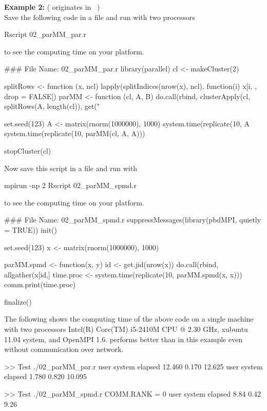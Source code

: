 {\bf Example 2:} ( originates in ~\citep{Tierney2012}) \\
Save the following code in a file and run with two processors
\begin{Command}
Rscript 02_parMM_par.r
\end{Command}
to see the computing time on your platform.
\begin{Code}[title=\pkg{snow} R Script]
### File Name: 02_parMM_par.r
library(parallel)
cl <- makeCluster(2)

splitRows <- function (x, ncl){
  lapply(splitIndices(nrow(x), ncl), function(i) x[i, , drop = FALSE])
}
parMM <- function (cl, A, B){
  do.call(rbind, clusterApply(cl, splitRows(A, length(cl)), get("%
}

set.seed(123)
A <- matrix(rnorm(1000000), 1000)
system.time(replicate(10, A %
system.time(replicate(10, parMM(cl, A, A)))

stopCluster(cl)
\end{Code}
Now save this script in a file and run with
\begin{Command}
mpirun -np 2 Rscript 02_parMM_spmd.r
\end{Command}
to see the computing time on your platform.
\begin{Code}[title=SPMD R Script]
### File Name: 02_parMM_spmd.r
suppressMessages(library(pbdMPI, quietly = TRUE))
init()

set.seed(123)
x <- matrix(rnorm(1000000), 1000)

parMM.spmd <- function(x, y){
  id <- get.jid(nrow(x))
  do.call(rbind, allgather(x[id,] %
}
time.proc <- system.time(replicate(10, parMM.spmd(x, x)))
comm.print(time.proc)

finalize()
\end{Code}

The following shows the computing time of the above code
on a single machine with two processors
Intel(R) Core(TM) i5-2410M CPU @ 2.30 GHz, xubuntu 11.04 system,
and OpenMPI 1.6.  performs better than  in this
example even without communication over network.
\begin{CodeOutput}
>> Test ./02_parMM_par.r
   user  system elapsed 
 12.460   0.170  12.625 
   user  system elapsed 
  1.780   0.820  10.095 

>> Test ./02_parMM_spmd.r
COMM.RANK = 0
   user  system elapsed 
   8.84    0.42    9.26 
\end{CodeOutput}
